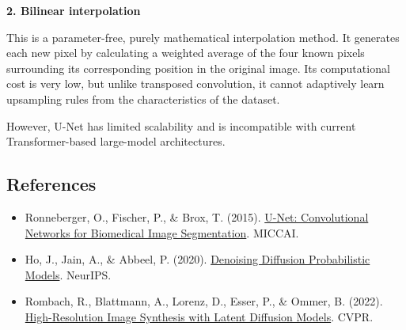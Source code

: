 \textbf{2. Bilinear interpolation}

This is a parameter-free, purely mathematical interpolation method. It generates each new pixel by calculating a weighted average of the four known pixels surrounding its corresponding position in the original image. Its computational cost is very low, but unlike transposed convolution, it cannot adaptively learn upsampling rules from the characteristics of the dataset.

However, U-Net has limited scalability and is incompatible with current Transformer-based large-model architectures.

\FloatBarrier
{}
\hypertarget{references-130}{%
\subsection{References}\label{references-130}}

\vspace{0.25em}
\begin{itemize}
\tightlist
\item
  Ronneberger, O., Fischer, P., \& Brox, T. (2015). \href{https://arxiv.org/abs/1505.04597}{U-Net: Convolutional Networks for Biomedical Image Segmentation}. MICCAI.
\item
  Ho, J., Jain, A., \& Abbeel, P. (2020). \href{https://arxiv.org/abs/2006.11239}{Denoising Diffusion Probabilistic Models}. NeurIPS.
\item
  Rombach, R., Blattmann, A., Lorenz, D., Esser, P., \& Ommer, B. (2022). \href{https://arxiv.org/abs/2112.10752}{High-Resolution Image Synthesis with Latent Diffusion Models}. CVPR.
\end{itemize}

\clearpage
